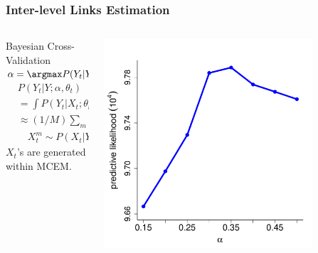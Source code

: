 \documentclass[sansserif, 10pt]{beamer}
\begin{document}
\begin{frame}
  \frametitle{Inter-level Links Estimation}
  \begin{columns}
    \begin{column}{0.55\textwidth}
      \begin{block}{Bayesian  Cross-Validation}
          $\alpha = \argmax P(Y_t|Y;\alpha, \theta_t)$ \\
          \begin{align*}
            &P(Y_t | Y;\alpha, \theta_t)\\
            &= \int P(Y_t | X_t; \theta_t) P(X_t| Y;\alpha)\, \textrm{d} X_t \\
            &\approx (1/M)\sum_m P(Y_t|X_t^m; \alpha, \theta_t),\\
            &\quad X_t^m \sim P(X_t|Y; \alpha).
          \end{align*}
          $X_t$'s are generated within MCEM.
        \end{block}
      \end{column}

    \begin{column}{0.45\textwidth}
      \includegraphics[width = 0.8\textwidth]{sfig/predictLLvsAlpha}
      \end{column}
    \end{columns}
\end{frame}
\end{document}
